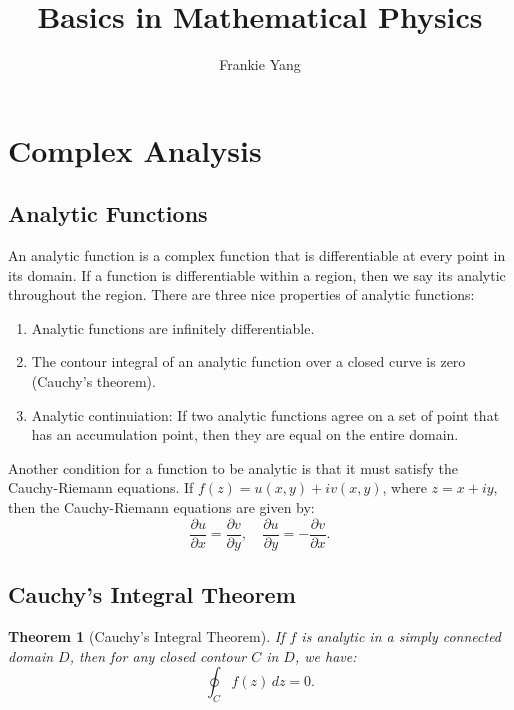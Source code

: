 \documentclass{article}
\title{Basics in Mathematical Physics}
\author{Frankie Yang}
\date{}
\newtheorem{theorem}{Theorem}[section]
\begin{document}
\maketitle

\tableofcontents

\newpage

\section{Complex Analysis}
\subsection{Analytic Functions}

An analytic function is a complex function that is differentiable at every point in its domain. If a function is differentiable within a region, then we say its analytic throughout the region. There are three nice properties of analytic functions:
\begin{enumerate}
    \item Analytic functions are infinitely differentiable.
    \item The contour integral of an analytic function over a closed curve is zero (Cauchy's theorem).
    \item Analytic continuiation: If two analytic functions agree on a set of point that has an accumulation point, then they are equal on the entire domain.
\end{enumerate}

Another condition for a function to be analytic is that it must satisfy the Cauchy-Riemann equations. If $f(z) = u(x,y) + iv(x,y)$, where $z = x + iy$, then the Cauchy-Riemann equations are given by:
\begin{equation}
\frac{\partial u}{\partial x} = \frac{\partial v}{\partial y}, \quad \frac{\partial u}{\partial y} = -\frac{\partial v}{\partial x}.
\end{equation}

\subsection{Cauchy's Integral Theorem}
\begin{theorem}[Cauchy's Integral Theorem]
 If $f$ is analytic in a simply connected domain $D$, then for any closed contour $C$ in $D$, we have:
\begin{equation}
\oint_C f(z) \, dz = 0.
\end{equation}
\end{theorem}
\end{document}
